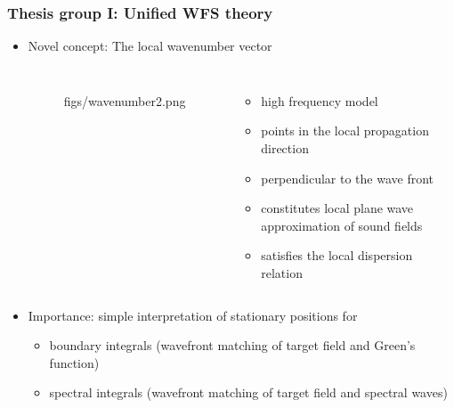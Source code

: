 \documentclass{beamer}
\begin{document}
\begin{frame}
\frametitle{Thesis group I: Unified WFS theory}
\begin{itemize}
\item Novel concept: The local wavenumber vector
\begin{columns}
%
\begin{figure}
	\centering
	\begin{overpic}[width = 0.9\columnwidth]{figs/wavenumber2.png}
	\scriptsize
	\end{overpic}
\end{figure}
\footnotesize
%
\begin{itemize}
\item high frequency model
\item points in the local propagation direction
\item perpendicular to the wave front
\item constitutes local plane wave approximation of sound fields
\item satisfies the local dispersion relation
\end{itemize}
\end{columns}
\item Importance: simple interpretation of stationary positions for
\begin{itemize}\footnotesize	
\item boundary integrals (wavefront matching of target field and Green's function)
\item spectral integrals (wavefront matching of target field and spectral waves)
\end{itemize}
\end{itemize}
\end{frame} 
\end{document}
